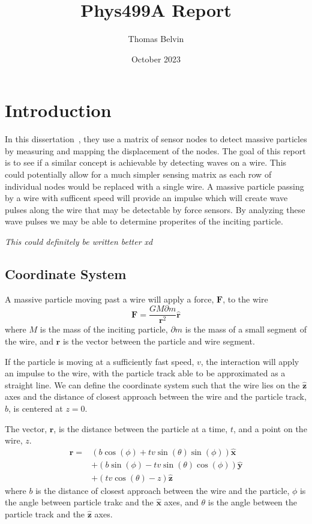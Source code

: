 \documentclass{report}
\title{Phys499A Report}
\author{Thomas Belvin}
\date{October 2023}
\begin{document}
\maketitle
\chapter*{Introduction}
In this dissertation~\cite{Gosh2023}, they use a matrix of sensor nodes to detect massive particles by measuring and mapping the displacement of the nodes.
The goal of this report is to see if a similar concept is achievable by detecting waves on a wire.
This could potentially allow for a much simpler sensing matrix as each row of individual nodes would be replaced with a single wire.
A massive particle passing by a wire with sufficent speed will provide an impulse which will create wave pulses along the wire that may be detectable by force sensors. 
By analyzing these wave pulses we may be able to determine properites of the inciting particle.

\emph{This could definitely be written better xd}
\section*{Coordinate System}
A massive particle moving past a wire will apply a force, $\mathbf{F}$, to the wire 
\begin{equation}
    \mathbf{F} = \frac{G M \partial m}{\mathbf{r}^2} \mathbf{\hat r}
    \label{eqn:force}
\end{equation}
where $M$ is the mass of the inciting particle, $\partial m$ is the mass of a small segment of the wire, and $\mathbf{r}$ is the vector between the particle and wire segment.

If the particle is moving at a sufficiently fast speed, $v$, the  interaction will apply an impulse to the wire, with the particle track able to be approximated as a straight line. 
We can define the coordinate system such that the wire lies on the $\mathbf{\hat z}$ axes and the distance of closest approach between the wire and the particle track, $b$, is centered at $z = 0$.

The vector, $\mathbf{r}$, is the distance between the particle at a time, $t$, and a point on the wire, $z$.
\begin{align}
    \nonumber \mathbf{r}=& (b \cos (\phi )+t v \sin (\theta ) \sin (\phi )) \mathbf{\hat x} \\
               \nonumber & +(b \sin (\phi )-t v \sin (\theta ) \cos (\phi )) \mathbf{\hat y}\\
                         & + (t v \cos (\theta )-z) \mathbf{\hat z}
    \label{eqn:r}
\end{align}
where $b$ is the distance of closest approach between the wire and the particle, $\phi$ is the angle between particle trakc and the $\mathbf{\hat x}$ axes, and $\theta$ is the angle between the particle track and the $\mathbf{\hat z}$ axes.
\end{document}
